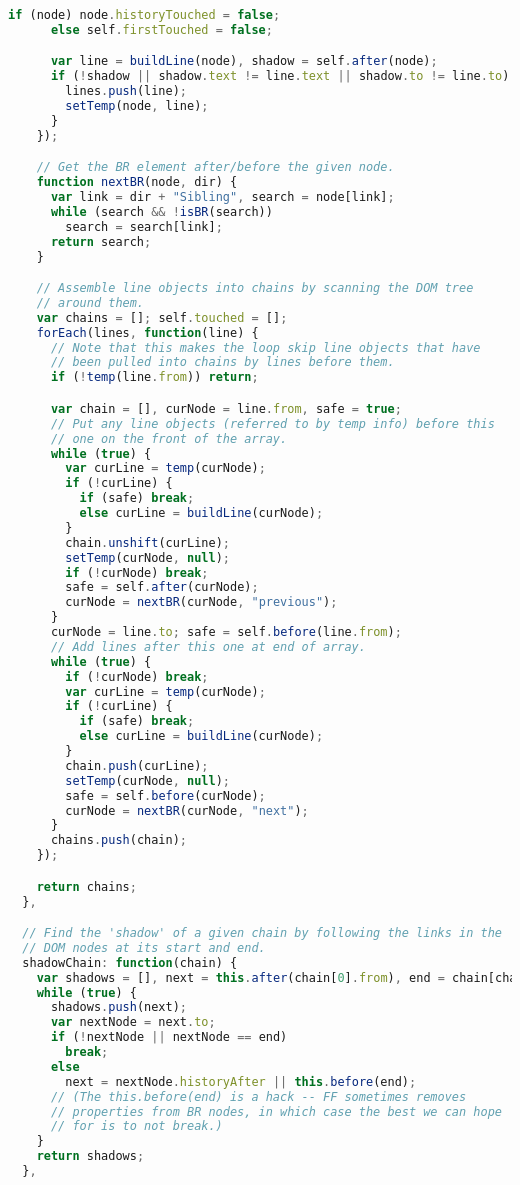 \begin{lstlisting}[language=Javascript]
      if (node) node.historyTouched = false;
      else self.firstTouched = false;

      var line = buildLine(node), shadow = self.after(node);
      if (!shadow || shadow.text != line.text || shadow.to != line.to) {
        lines.push(line);
        setTemp(node, line);
      }
    });

    // Get the BR element after/before the given node.
    function nextBR(node, dir) {
      var link = dir + "Sibling", search = node[link];
      while (search && !isBR(search))
        search = search[link];
      return search;
    }

    // Assemble line objects into chains by scanning the DOM tree
    // around them.
    var chains = []; self.touched = [];
    forEach(lines, function(line) {
      // Note that this makes the loop skip line objects that have
      // been pulled into chains by lines before them.
      if (!temp(line.from)) return;

      var chain = [], curNode = line.from, safe = true;
      // Put any line objects (referred to by temp info) before this
      // one on the front of the array.
      while (true) {
        var curLine = temp(curNode);
        if (!curLine) {
          if (safe) break;
          else curLine = buildLine(curNode);
        }
        chain.unshift(curLine);
        setTemp(curNode, null);
        if (!curNode) break;
        safe = self.after(curNode);
        curNode = nextBR(curNode, "previous");
      }
      curNode = line.to; safe = self.before(line.from);
      // Add lines after this one at end of array.
      while (true) {
        if (!curNode) break;
        var curLine = temp(curNode);
        if (!curLine) {
          if (safe) break;
          else curLine = buildLine(curNode);
        }
        chain.push(curLine);
        setTemp(curNode, null);
        safe = self.before(curNode);
        curNode = nextBR(curNode, "next");
      }
      chains.push(chain);
    });

    return chains;
  },

  // Find the 'shadow' of a given chain by following the links in the
  // DOM nodes at its start and end.
  shadowChain: function(chain) {
    var shadows = [], next = this.after(chain[0].from), end = chain[chain.length - 1].to;
    while (true) {
      shadows.push(next);
      var nextNode = next.to;
      if (!nextNode || nextNode == end)
        break;
      else
        next = nextNode.historyAfter || this.before(end);
      // (The this.before(end) is a hack -- FF sometimes removes
      // properties from BR nodes, in which case the best we can hope
      // for is to not break.)
    }
    return shadows;
  },


\end{lstlisting}
